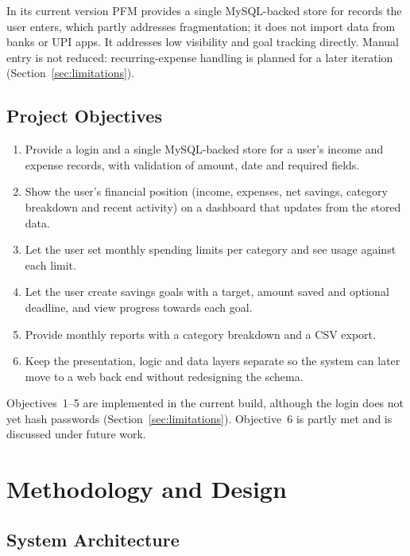 \documentclass{tietreport}
\begin{document}
In its current version PFM provides a single MySQL-backed store for
records the user enters, which partly addresses fragmentation; it
does not import data from banks or UPI apps. It addresses low
visibility and goal tracking directly. Manual entry is not
reduced: recurring-expense handling is planned for a later
iteration (Section~\ref{sec:limitations}).

\section{Project Objectives}

\begin{enumerate}
  \item Provide a login and a single MySQL-backed store for a
    user's income and expense records, with validation of amount,
    date and required fields.
  \item Show the user's financial position (income, expenses, net
    savings, category breakdown and recent activity) on a
    dashboard that updates from the stored data.
  \item Let the user set monthly spending limits per category and
    see usage against each limit.
  \item Let the user create savings goals with a target, amount
    saved and optional deadline, and view progress towards each
    goal.
  \item Provide monthly reports with a category breakdown and a
    CSV export.
  \item Keep the presentation, logic and data layers separate so
    the system can later move to a web back end without
    redesigning the schema.
\end{enumerate}

Objectives~1--5 are implemented in the current build, although the
login does not yet hash passwords (Section~\ref{sec:limitations}).
Objective~6 is partly met and is discussed under future work.


\chapter{Methodology and Design}

\section{System Architecture}
\end{document}
